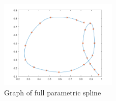 \documentclass[11pt]{article}
\begin{document}
\begin{enumerate}
		\begin{figure}[H]
			\centering
			\includegraphics[width=0.5\textwidth]{profile_s.png}
			\caption{Graph of full parametric spline}
		\end{figure} \

\end{enumerate}
\end{document}
